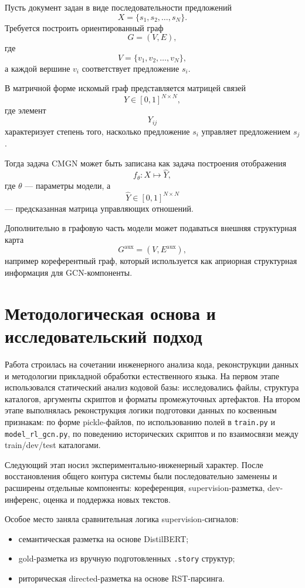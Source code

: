 \documentclass[12pt,a4paper]{article}
\begin{document}
Пусть документ задан в виде последовательности предложений
\[
X = \{s_1, s_2, \dots, s_N\}.
\]
Требуется построить ориентированный граф
\[
G = (V, E),
\]
где
\[
V = \{v_1, v_2, \dots, v_N\},
\]
а каждой вершине $v_i$ соответствует предложение $s_i$.

В матричной форме искомый граф представляется матрицей связей
\[
Y \in [0,1]^{N \times N},
\]
где элемент
\[
Y_{ij}
\]
характеризует степень того, насколько предложение $s_i$ управляет предложением $s_j$.

Тогда задача CMGN может быть записана как задача построения отображения
\[
f_{\theta}: X \mapsto \hat{Y},
\]
где $\theta$ --- параметры модели, а
\[
\hat{Y} \in [0,1]^{N \times N}
\]
--- предсказанная матрица управляющих отношений.

Дополнительно в графовую часть модели может подаваться внешняя структурная карта
\[
G^{\text{aux}} = (V, E^{\text{aux}}),
\]
например кореферентный граф, который используется как априорная структурная информация
для GCN-компоненты.

\section{Методологическая основа и исследовательский подход}

Работа строилась на сочетании инженерного анализа кода, реконструкции данных и
методологии прикладной обработки естественного языка. На первом этапе использовался
статический анализ кодовой базы: исследовались файлы, структура каталогов, аргументы
скриптов и форматы промежуточных артефактов. На втором этапе выполнялась реконструкция
логики подготовки данных по косвенным признакам: по форме pickle-файлов, по использованию
полей в \texttt{train.py} и \texttt{model\_rl\_gcn.py}, по поведению исторических
скриптов и по взаимосвязи между train/dev/test каталогами.

Следующий этап носил экспериментально-инженерный характер. После восстановления общего
контура системы были последовательно заменены и расширены отдельные компоненты:
кореференция, supervision-разметка, dev-инференс, оценка и поддержка новых текстов.
\newline

Особое место заняла сравнительная логика supervision-сигналов:

\begin{itemize}
    \item семантическая разметка на основе DistilBERT;
    \item gold-разметка из вручную подготовленных \texttt{.story} структур;
    \item риторическая directed-разметка на основе RST-парсинга.
\end{itemize}
\end{document}
